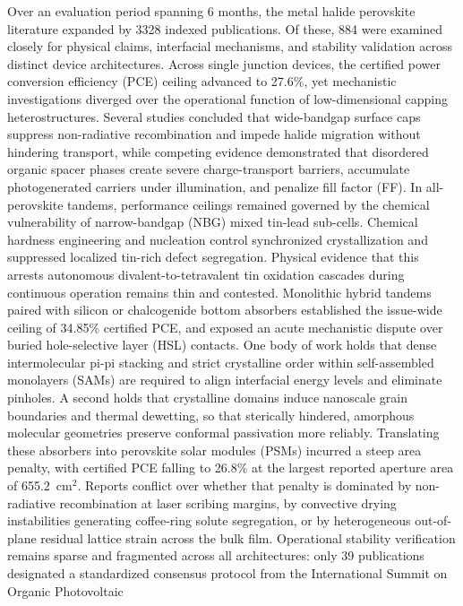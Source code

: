 \documentclass[
  11pt,
]{article}
\begin{document}
Over an evaluation period spanning 6 months, the metal halide perovskite
literature expanded by 3328 indexed publications. Of these, 884 were
examined closely for physical claims, interfacial mechanisms, and
stability validation across distinct device architectures. Across single
junction devices, the certified power conversion efficiency (PCE)
ceiling advanced to 27.6\%, yet mechanistic investigations diverged over
the operational function of low-dimensional capping heterostructures.
Several studies concluded that wide-bandgap surface caps suppress
non-radiative recombination and impede halide migration without
hindering transport, while competing evidence demonstrated that
disordered organic spacer phases create severe charge-transport
barriers, accumulate photogenerated carriers under illumination, and
penalize fill factor (FF). In all-perovskite tandems, performance
ceilings remained governed by the chemical vulnerability of
narrow-bandgap (NBG) mixed tin-lead sub-cells. Chemical hardness
engineering and nucleation control synchronized crystallization and
suppressed localized tin-rich defect segregation. Physical evidence that
this arrests autonomous divalent-to-tetravalent tin oxidation cascades
during continuous operation remains thin and contested. Monolithic
hybrid tandems paired with silicon or chalcogenide bottom absorbers
established the issue-wide ceiling of 34.85\% certified PCE, and exposed
an acute mechanistic dispute over buried hole-selective layer (HSL)
contacts. One body of work holds that dense intermolecular pi-pi
stacking and strict crystalline order within self-assembled monolayers
(SAMs) are required to align interfacial energy levels and eliminate
pinholes. A second holds that crystalline domains induce nanoscale grain
boundaries and thermal dewetting, so that sterically hindered, amorphous
molecular geometries preserve conformal passivation more reliably.
Translating these absorbers into perovskite solar modules (PSMs)
incurred a steep area penalty, with certified PCE falling to 26.8\% at
the largest reported aperture area of \qty{655.2}{\centi\meter}\(^2\).
Reports conflict over whether that penalty is dominated by non-radiative
recombination at laser scribing margins, by convective drying
instabilities generating coffee-ring solute segregation, or by
heterogeneous out-of-plane residual lattice strain across the bulk film.
Operational stability verification remains sparse and fragmented across
all architectures: only 39 publications designated a standardized
consensus protocol from the International Summit on Organic Photovoltaic
\end{document}
